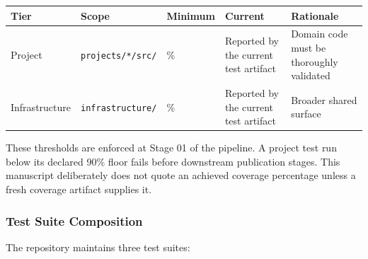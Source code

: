 \documentclass[
  english,
]{article}
\newcounter{none} %
\begin{document}
{\def\LTcaptype{none} %
\begin{longtable}[]{@{}
  >{\raggedright\arraybackslash}p{}
  >{\raggedright\arraybackslash}p{}
  >{\centering\arraybackslash}p{}
  >{\centering\arraybackslash}p{}
  >{\raggedright\arraybackslash}p{}@{}}
\toprule\noalign{}
\begin{minipage}[b]{\linewidth}\raggedright
Tier
\end{minipage} & \begin{minipage}[b]{\linewidth}\raggedright
Scope
\end{minipage} & \begin{minipage}[b]{\linewidth}\centering
Minimum
\end{minipage} & \begin{minipage}[b]{\linewidth}\centering
Current
\end{minipage} & \begin{minipage}[b]{\linewidth}\raggedright
Rationale
\end{minipage} \\
\midrule\noalign{}
\endhead
\bottomrule\noalign{}
\endlastfoot
Project & \texttt{projects/*/src/} & 90\% & Reported by the current test
artifact & Domain code must be thoroughly validated \\
Infrastructure & \texttt{infrastructure/} & 60\% & Reported by the
current test artifact & Broader shared surface \\
\end{longtable}
}

These thresholds are enforced at Stage 01 of the pipeline. A project
test run below its declared 90\% floor fails before downstream
publication stages. This manuscript deliberately does not quote an
achieved coverage percentage unless a fresh coverage artifact supplies
it.

\subsubsection{Test Suite Composition}\label{test-suite-composition}

The repository maintains three test suites:
\end{document}
